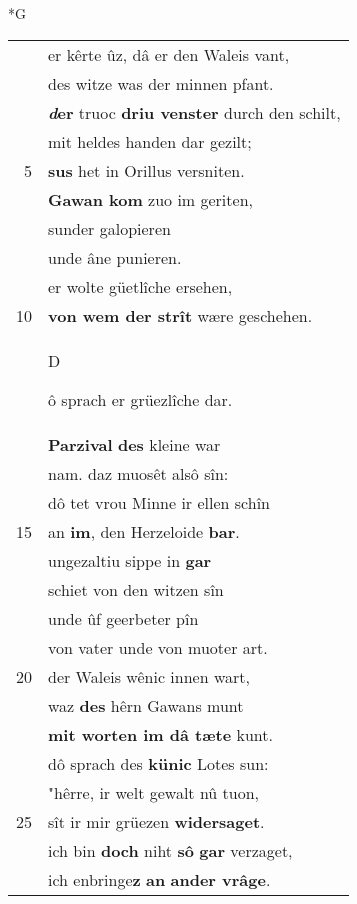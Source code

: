 \documentclass[8pt,a4paper,notitlepage]{article}
\begin{document}
\begin{table}[ht]
\begin{minipage}[t]{0.5\linewidth}
\small
\begin{center}*G
\end{center}
\begin{tabular}{rl}
 & er kêrte ûz, dâ er den Waleis vant,\\ 
 & des witze was der minnen pfant.\\ 
 & \textbf{\textit{d}er} truoc \textbf{driu venster} durch den schilt,\\ 
 & mit heldes handen dar gezilt;\\ 
5 & \textbf{sus} het in Orillus versniten.\\ 
 & \textbf{Gawan kom} zuo im geriten,\\ 
 & sunder galopieren\\ 
 & unde âne punieren.\\ 
 & er wolte güetlîche ersehen,\\ 
10 & \textbf{von wem der strît} wære geschehen.\\ 
 & \begin{large}D\end{large}ô sprach er grüezlîche dar.\\ 
 & \textbf{Parzival} \textbf{des} kleine war\\ 
 & nam. daz muosêt alsô sîn:\\ 
 & dô tet vrou Minne ir ellen schîn\\ 
15 & an \textbf{im}, den Herzeloide \textbf{bar}.\\ 
 & ungezaltiu sippe in \textbf{gar}\\ 
 & schiet von den witzen sîn\\ 
 & unde ûf geerbeter pîn\\ 
 & von vater unde von muoter art.\\ 
20 & der Waleis wênic innen wart,\\ 
 & waz \textbf{des} hêrn Gawans munt\\ 
 & \textbf{mit worten im dâ tæte} kunt.\\ 
 & dô sprach des \textbf{künic} Lotes sun:\\ 
 & "hêrre, ir welt gewalt nû tuon,\\ 
25 & sît ir mir grüezen \textbf{widersaget}.\\ 
 & ich bin \textbf{doch} niht \textbf{sô} \textbf{gar} verzaget,\\ 
 & ich enbringe\textbf{z} \textbf{an} \textbf{ander vrâge}.\\ 

\end{tabular}
\end{minipage}
\end{table}
\end{document}

